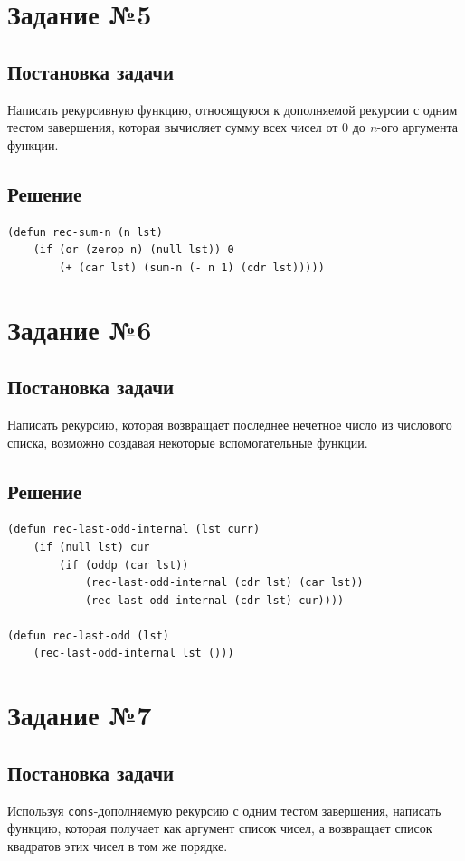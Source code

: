 \documentclass[12pt]{report}
\begin{document}
\section*{Задание №5}
\subsection*{Постановка задачи}
Написать рекурсивную функцию, относящуюся к дополняемой рекурсии с одним тестом завершения, которая вычисляет сумму всех чисел от 0 до \textit{n}-ого аргумента функции.

\subsection*{Решение}
\begin{lstlisting}
(defun rec-sum-n (n lst)
	(if (or (zerop n) (null lst)) 0
		(+ (car lst) (sum-n (- n 1) (cdr lst)))))
\end{lstlisting}

\section*{Задание №6}
\subsection*{Постановка задачи}
Написать рекурсию, которая возвращает последнее нечетное число из числового списка, возможно создавая некоторые вспомогательные функции.

\clearpage
\subsection*{Решение}
\begin{lstlisting}
(defun rec-last-odd-internal (lst curr)
	(if (null lst) cur
		(if (oddp (car lst))
			(rec-last-odd-internal (cdr lst) (car lst))
			(rec-last-odd-internal (cdr lst) cur))))

(defun rec-last-odd (lst)
	(rec-last-odd-internal lst ()))
\end{lstlisting}

\section*{Задание №7}
\subsection*{Постановка задачи}
Используя \texttt{cons}-дополняемую рекурсию с одним тестом завершения, написать функцию, которая получает как аргумент список чисел, а возвращает список квадратов этих чисел в том же порядке.
\end{document}
